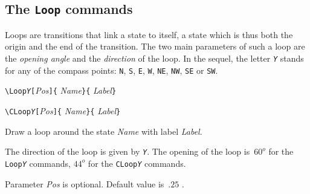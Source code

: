 \documentclass[11pt,twoside]{article}
\newlength{\ColoText}%
\newlength{\ColoFigu}%
\newlength{\parindenttemp} %
\newcommand{\noi}{\noindent}
\newlength{\jsIndent}%
\begin{document}
\subsection{The \texttt{Loop} commands}\label{subsec.loo}

Loops are transitions that link a state to itself, a state which is 
thus both the origin and the end of the transition.
The two main parameters of such a loop are the \emph{opening angle} 
and the \emph{direction} of the loop.
In the sequel, the letter \texttt{\textsl{Y}} stands for any of the compass 
points: \verb+N+, \verb+S+, \verb+E+, \verb+W+, \verb+NE+, \verb+NW+, 
\verb+SE+ or \verb+SW+. 

\noi 
\hspace*{-\jsIndent}
\begin{minipage}[t]{\ColoText}
        \par\vspace*{0mm}%
\medskip 
        \footnotesize
\verb+\Loop+\texttt{\textsl{Y}}\verb+[+\textsl{Pos}\verb+]{+%
   \textsl{Name}\verb+}{+%
   \textsl{Label}\verb+}+
   
\medskip 
\verb+\CLoop+\texttt{\textsl{Y}}\verb+[+\textsl{Pos}\verb+]{+%
   \textsl{Name}\verb+}{+%
   \textsl{Label}\verb+}+
\end{minipage}%
\hspace*{1.2em}%
\begin{minipage}[t]{\ColoFigu}%
\par\vspace*{0mm}%
Draw a loop around the state {\sl Name} with label {\sl Label}.

The direction of the loop is given by \texttt{\textsl{Y}}.
The opening of the loop is~$60^o$ for the \verb+Loop+\texttt{\textsl{Y}}\verb++ commands,
$44^o$ for the \verb+CLoop+\texttt{\textsl{Y}}\verb++ commands.

Parameter {\sl Pos} is optional. 
Default value is~$.25$ .
\end{minipage}%

\medskip 
\end{document}

